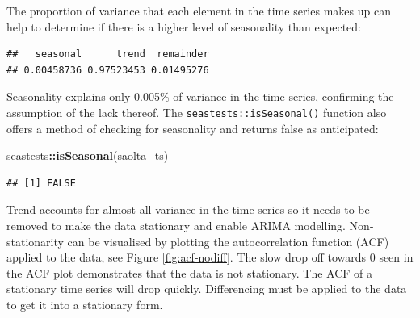 \documentclass[
  12pt,
]{article}
\newenvironment{Shaded}{\begin{snugshade}}{\end{snugshade}}
\newcommand{\DecValTok}[1]{\textcolor[rgb]{0.00,0.00,0.81}{#1}}
\newcommand{\KeywordTok}[1]{\textcolor[rgb]{0.13,0.29,0.53}{\textbf{#1}}}
\newcommand{\NormalTok}[1]{#1}
\newcommand{\OperatorTok}[1]{\textcolor[rgb]{0.81,0.36,0.00}{\textbf{#1}}}
\newcommand{\StringTok}[1]{\textcolor[rgb]{0.31,0.60,0.02}{#1}}
\begin{document}
The proportion of variance that each element in the time series makes up can help to determine if there is a higher level of seasonality than expected:
\small

\begin{Shaded}
\end{Shaded}

\begin{verbatim}
##   seasonal      trend  remainder 
## 0.00458736 0.97523453 0.01495276
\end{verbatim}

\normalsize

Seasonality explains only 0.005\% of variance in the time series, confirming the assumption of the lack thereof. The \texttt{seastests::isSeasonal()} function also offers a method of checking for seasonality and returns false as anticipated:
\small

\begin{Shaded}
\begin{Highlighting}[]
\NormalTok{seastests}\OperatorTok{::}\KeywordTok{isSeasonal}\NormalTok{(saolta\_ts)}
\end{Highlighting}
\end{Shaded}

\begin{verbatim}
## [1] FALSE
\end{verbatim}

\normalsize

Trend accounts for almost all variance in the time series so it needs to be removed to make the data stationary and enable ARIMA modelling. Non-stationarity can be visualised by plotting the autocorrelation function (ACF) applied to the data, see Figure \ref{fig:acf-nodiff}. The slow drop off towards 0 seen in the ACF plot demonstrates that the data is not stationary. The ACF of a stationary time series will drop quickly. Differencing must be applied to the data to get it into a stationary form.
\end{document}
